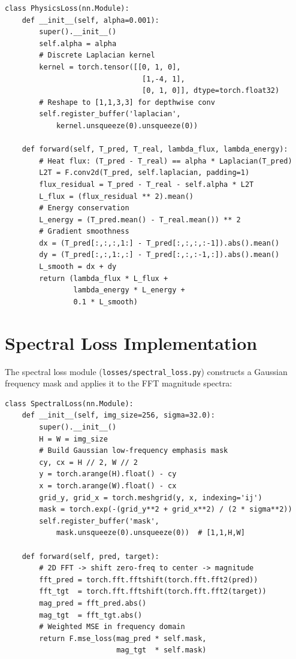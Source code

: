 \begin{verbatim}
class PhysicsLoss(nn.Module):
    def __init__(self, alpha=0.001):
        super().__init__()
        self.alpha = alpha
        # Discrete Laplacian kernel
        kernel = torch.tensor([[0, 1, 0],
                                [1,-4, 1],
                                [0, 1, 0]], dtype=torch.float32)
        # Reshape to [1,1,3,3] for depthwise conv
        self.register_buffer('laplacian',
            kernel.unsqueeze(0).unsqueeze(0))

    def forward(self, T_pred, T_real, lambda_flux, lambda_energy):
        # Heat flux: (T_pred - T_real) == alpha * Laplacian(T_pred)
        L2T = F.conv2d(T_pred, self.laplacian, padding=1)
        flux_residual = T_pred - T_real - self.alpha * L2T
        L_flux = (flux_residual ** 2).mean()
        # Energy conservation
        L_energy = (T_pred.mean() - T_real.mean()) ** 2
        # Gradient smoothness
        dx = (T_pred[:,:,:,1:] - T_pred[:,:,:,:-1]).abs().mean()
        dy = (T_pred[:,:,1:,:] - T_pred[:,:,:-1,:]).abs().mean()
        L_smooth = dx + dy
        return (lambda_flux * L_flux +
                lambda_energy * L_energy +
                0.1 * L_smooth)
\end{verbatim}

\section{Spectral Loss Implementation}

The spectral loss module (\texttt{losses/spectral\_loss.py}) constructs a Gaussian frequency mask and applies it to the FFT magnitude spectra:

\begin{verbatim}
class SpectralLoss(nn.Module):
    def __init__(self, img_size=256, sigma=32.0):
        super().__init__()
        H = W = img_size
        # Build Gaussian low-frequency emphasis mask
        cy, cx = H // 2, W // 2
        y = torch.arange(H).float() - cy
        x = torch.arange(W).float() - cx
        grid_y, grid_x = torch.meshgrid(y, x, indexing='ij')
        mask = torch.exp(-(grid_y**2 + grid_x**2) / (2 * sigma**2))
        self.register_buffer('mask',
            mask.unsqueeze(0).unsqueeze(0))  # [1,1,H,W]

    def forward(self, pred, target):
        # 2D FFT -> shift zero-freq to center -> magnitude
        fft_pred = torch.fft.fftshift(torch.fft.fft2(pred))
        fft_tgt  = torch.fft.fftshift(torch.fft.fft2(target))
        mag_pred = fft_pred.abs()
        mag_tgt  = fft_tgt.abs()
        # Weighted MSE in frequency domain
        return F.mse_loss(mag_pred * self.mask,
                          mag_tgt  * self.mask)
\end{verbatim}

